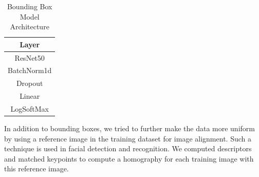 \begin{table}[h!]
	\centering
	\begin{tabular}{|c|}\hline
		\textbf{Layer}\\ \hline
		ResNet50 \\\hline
		BatchNorm1d \\ \hline
		Dropout \\ \hline
		Linear \\ \hline
		LogSoftMax \\ \hline
	\end{tabular}
	\caption{\label{tab:bbres} Bounding Box Model Architecture}
\end{table}

In addition to bounding boxes, we tried to further make the data more uniform by using a reference image in the training dataset for image alignment. Such a technique is used in facial detection and recognition. We computed descriptors and matched keypoints to compute a homography for each training image with this reference image. 